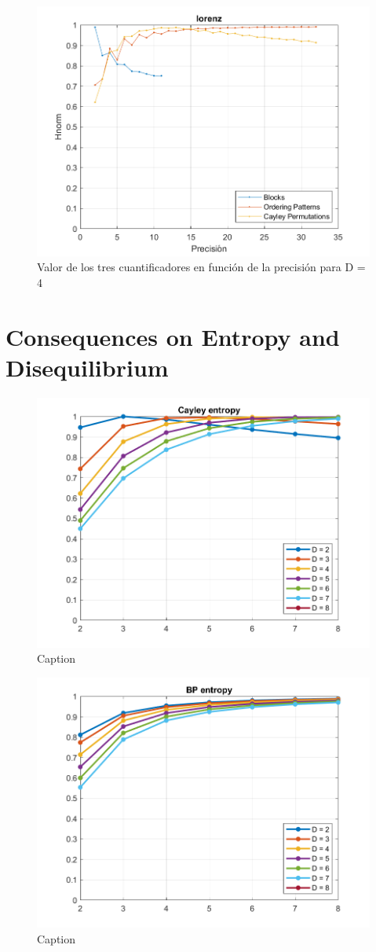 \documentclass[twocolumn]{article}
\begin{document}
\begin{figure}[h]
  \centering
  \includegraphics[width=.5\textwidth]{lorenzCuantis.png}
  \caption{Valor de los tres cuantificadores en función de la precisión para D = 4}
  \label{fig:randCuantis}


\end{figure}
\section{Consequences on Entropy and Disequilibrium}

\begin{figure}
    \centering
    \includegraphics[width=.5\textwidth]{cayleyHvsN.png}
    \caption{Caption}
    \label{fig:cayleyvsN}
\end{figure}

\begin{figure}
    \centering
    \includegraphics[width=.5\textwidth]{bpHvsN.png}
    \caption{Caption}
    \label{fig:bpvsN}
\end{figure}
\end{document}

